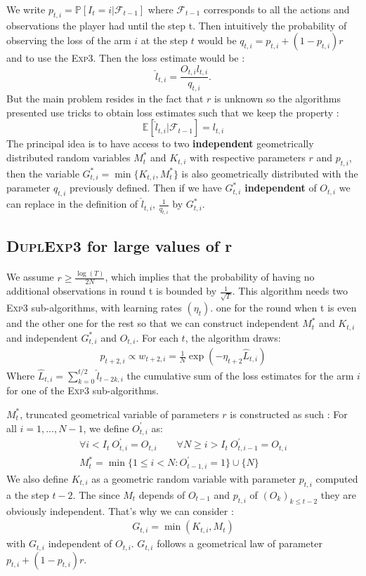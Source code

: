 \documentclass[11pt,a4paper]{article}
\begin{document}
We write $p_{t,i}=\mathbb{P}[I_t=i|\mathcal{F}_{t-1}]$ where $\mathcal{F}_{t-1}$ corresponds to all the actions and observations the player had until the step t. Then intuitively the probability of observing the loss of the arm $i$ at the step $t$ would be $q_{t,i}=p_{t,i} + (1-p_{t,i})r$ and to use the \textsc{Exp3}.
Then the loss estimate would be :
\[
\hat{l}_{t,i}=\frac{O_{t,i}l_{t,i}}{q_{t,i}}.
\]
But the main problem resides in the fact that $r$ is unknown so the algorithms presented use tricks to obtain loss estimates such that we keep the property :
\[
\mathbb{E}[\hat{l}_{t,i}|\mathcal{F}_{t-1}]=l_{t,i}
\]
The principal idea is to have access to two \textbf{independent} geometrically distributed random variables $M_t^*$ and $K_{t,i}$ with respective parameters $r$ and $p_{t,i}$, then the variable $G_{t,i}^*=\min\{K_{t,i},M_t^*\}$ is also geometrically distributed with the parameter $q_{t,i}$ previously defined. Then if we have $G_{t,i}^*$ \textbf{independent} of $O_{t,i}$ we can replace in the definition of $\hat{l}_{t,i}$, $\frac{1}{q_{t,i}}$ by $G_{t,i}^*$.

\subsection{\textsc{DuplExp3} for large values of r}
\paragraph{}We assume $ r\geq \frac{\log(T)}{2N}$, which implies that the probability of having no additional observations in round t is bounded by $\frac{1}{\sqrt{T}}$.\newline
This algorithm needs two \textsc{Exp3} sub-algorithms, with learning rates $\left(\eta_t\right)$. one for the round when t is even and the other one for the rest so that we can construct independent $M_t^*$ and $K_{t,i}$ and independent $G_{t,i}^*$ and $O_{t,i}$.
For each $t$, the algorithm draws:
\begin{align*}
p_{t+2,i}\propto w_{t+2,i}= \frac{1}{N} \exp\left( -\eta_{t+2} \hat{L}_{t,i} \right)
\end{align*}
Where $\hat{L}_{t,i}=\sum_{k=0}^{t/2} \hat{l}_{t-2k,i}$ the cumulative sum of the loss estimates for the arm $i$ for one of the \textsc{Exp3} sub-algorithms.

$M_t^*$, truncated geometrical variable of parameters $r$ is constructed as such : 
For all $i=1,...,N-1$, we define $O_{t,i}^{'}$ as:
\begin{align*}
\forall i<I_{t}\ O_{t,i}^{'}=O_{t,i} \qquad \forall N\geq i>I_{t}\ O_{t,i-1}^{'}=O_{t,i} \\
M_t^* =\min\{1\leq i<N: O_{t-1,i}^{'} =1\}\cup\{N\}
\end{align*}
We also define $K_{t,i}$ as a geometric random variable with parameter $p_{t,i}$ computed a the step $t-2$. The since $M_t$ depends of $O_{t-1}$ and $p_{t,i}$ of $\left(O_k\right)_{k\leq t-2}$ they are obviously independent. That's why we can consider :
\begin{align*}
	G_{t,i}=\min\left(K_{t,i},M_t\right)
\end{align*}
with $G_{t,i}$ independent of $O_{t,i}$. $G_{t,i}$ follows a geometrical law of parameter $p_{t,i}+(1-p_{t,i})r$.
\end{document}

